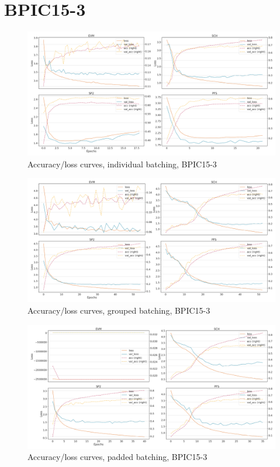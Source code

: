 \section*{BPIC15-3}
\begin{figure}[!htb]
    \centering
    \includegraphics[width=\textwidth]{gfx/bpic2015_3/individual_loss_acc_curve.png}
    \caption{Accuracy/loss curves, individual batching, BPIC15-3}
\end{figure}
\begin{figure}[!htb]
    \centering
    \includegraphics[width=\textwidth]{gfx/bpic2015_3/grouped_loss_acc_curve.png}
    \caption{Accuracy/loss curves, grouped batching, BPIC15-3}
\end{figure}
\begin{figure}[!htb]
    \centering
    \includegraphics[width=\textwidth]{gfx/bpic2015_3/padded_loss_acc_curve.png}
    \caption{Accuracy/loss curves, padded batching, BPIC15-3}
\end{figure}
